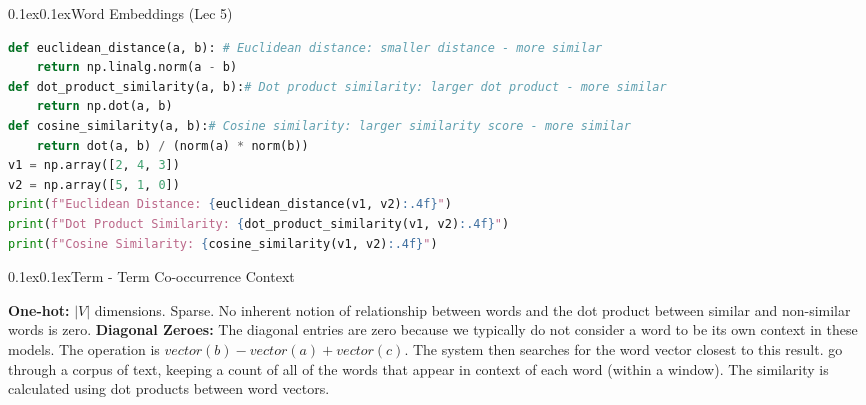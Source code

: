 \documentclass[8pt,landscape]{article}
\makeatletter
\renewcommand{\section}{\@startsection{section}{2}{0pt}%
    {0.1ex}{0.1ex}{\fontsize{8}{9}\bfseries\color{red}}}
\renewcommand{\subsection}{\@startsection{subsection}{2}{0pt}%
    {0.1ex}{0.1ex}{\fontsize{7}{8}\bfseries\color{blue}}}
\newcommand{\smalltext}[1]{{\fontsize{7}{8}\selectfont\sloppy #1\par}}
\makeatother
\begin{document}
\fontsize{7}{8}\selectfont 
\pagestyle{empty}
\begin{multicols}{3}

\section{Word Embeddings (Lec 5)}
\begin{lstlisting}[language=python]
def euclidean_distance(a, b): # Euclidean distance: smaller distance - more similar
    return np.linalg.norm(a - b)
def dot_product_similarity(a, b):# Dot product similarity: larger dot product - more similar 
    return np.dot(a, b)
def cosine_similarity(a, b):# Cosine similarity: larger similarity score - more similar
    return dot(a, b) / (norm(a) * norm(b))
v1 = np.array([2, 4, 3])
v2 = np.array([5, 1, 0])
print(f"Euclidean Distance: {euclidean_distance(v1, v2):.4f}")
print(f"Dot Product Similarity: {dot_product_similarity(v1, v2):.4f}")
print(f"Cosine Similarity: {cosine_similarity(v1, v2):.4f}")
\end{lstlisting}

\subsection{Term - Term Co-occurrence Context}
\smalltext{
    \textbf{One-hot:} $|V|$ dimensions. Sparse. No inherent notion of relationship between words and the dot product between similar and non-similar words is zero.
    \textbf{Diagonal Zeroes:} The diagonal entries are zero because we typically do not consider a word to be its own context in these models.
    The operation is $vector(b) - vector(a) + vector(c)$. The system then searches for the word vector closest to this result.
    go through a corpus of text, keeping a count of all of the words that appear in context of each word (within a window). The similarity is calculated using dot products between word vectors.

}


\end{multicols}
\end{document}
